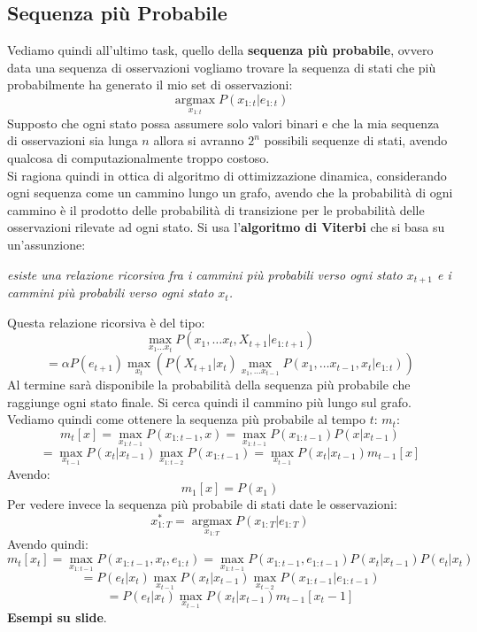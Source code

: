\documentclass[a4paper,12pt, oneside]{book}
\begin{document}
\subsection{Sequenza più Probabile}
Vediamo quindi all'ultimo task, quello della \textbf{sequenza più probabile},
ovvero data una sequenza di osservazioni vogliamo trovare la sequenza di stati
che più probabilmente ha generato il mio set di osservazioni:
\[\operatorname*{argmax}_{x_{1:t}}P(x_{1:t}|e_{1:t})\]
Supposto che ogni stato possa assumere solo valori binari e che la mia
sequenza di osservazioni sia lunga $n$ allora si avranno $2^n$ possibili
sequenze di stati, avendo qualcosa di computazionalmente troppo costoso.\\
Si ragiona quindi in ottica di algoritmo di ottimizzazione dinamica,
considerando ogni sequenza come un cammino lungo un grafo, avendo che la
probabilità di ogni cammino è il prodotto delle probabilità di transizione per
le probabilità delle osservazioni rilevate ad ogni stato. Si usa
l'\textbf{algoritmo di Viterbi} che si basa su un'assunzione:
\begin{center}
  \textit{esiste una relazione ricorsiva fra i cammini più probabili verso ogni
    stato $x_{t+1}$ e i cammini più probabili verso ogni stato $x_t$.}
\end{center}
Questa relazione ricorsiva è del tipo:
\[\max_{x_1\ldots x_t}P(x_1,\ldots x_t,X_{t+1}|e_{1:t+1})\]\[=\alpha
  P(e_{t+1})\max_{x_t}(P(X_{t+1}|x_t)\max_{x_1,\ldots x_{t-1}}P(x_1,\ldots
x_{t-1},x_t|e_{1:t}))\]
Al termine sarà disponibile la probabilità della sequenza più probabile che
raggiunge ogni stato finale. Si cerca quindi il cammino più lungo sul grafo.\\
Vediamo quindi come ottenere la sequenza più probabile al tempo $t$: $m_t$:
\[m_t[x]=\max_{x_{1:t-1}}P(x_{1:t-1},x)=\max_{x_{1:t-1}}P(x_{1:t-1})P(x|x_{t-1})\]
\[=\max_{x_{t-1}}P(x_t|x_{t-1})\max_{x_{1:t-2}}P(x_{1:t-1})=
  \max_{x_{t-1}}P(x_t|x_{t-1})m_{t-1}[x]\]
Avendo:
\[m_1[x]=P(x_1)\]
Per vedere invece la sequenza più probabile di stati date le osservazioni:
\[x_{1:T}^*=\operatorname*{argmax}_{x_{1:T}}P(x_{1:T}|e_{1:T})\]
Avendo quindi:
\[m_t[x_t]=\max_{x_{1:t-1}}P(x_{1:t-1},x_t,e_{1:t})=
\max_{x_{1:t-1}}P(x_{1:t-1},e_{1:t-1})P(x_t|x_{t-1})P(e_t|x_t)\]
\[=P(e_t|x_t)\max_{x_{t-1}}P(x_t|x_{t-1})\max_{x_{t-2}}P(x_{1:t-1}|e_{1:t-1})\]
\[=P(e_t|x_t)\max_{x_{t-1}}P(x_t|x_{t-1})m_{t-1}[x_t-1]\]
\textbf{Esempi su slide}.
\end{document}
